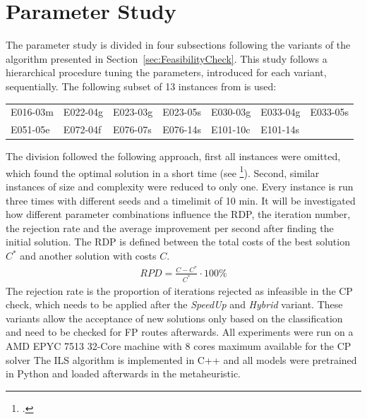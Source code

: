 \section{Parameter Study}
\label{sec:parameter_study}

The parameter study is divided in four subsections following the variants of the algorithm
presented in Section~\ref{sec:FeasibilityCheck}. This study follows a hierarchical procedure
tuning the parameters, introduced for each variant, sequentially. The following subset of 13
instances from \gendreauDataSetText is used:


\begin{table}[ht]
    \centering
    \setlength{\tabcolsep}{0.75em}
    \def\arraystretch{1.5}
    \begin{tabular}{lllllll}
        E016-03m & E022-04g & E023-03g & E023-05s & E030-03g & E033-04g & E033-05s \\
        E051-05e & E072-04f & E076-07s & E076-14s & E101-10c & E101-14s &          \\
    \end{tabular}
\end{table}

The division followed the following approach, first all instances were omitted, which found
the optimal solution in a short time (see \cite{tamke_branch-and-cut_2024}\footcite[cf.][p.26]{tamke_branch-and-cut_2024}).
Second, similar instances of size and complexity were reduced to only one.
Every instance is run three times with different seeds and a timelimit of 10 min. It will be investigated
how different parameter combinations influence the \gls{RDP}, the iteration number, the rejection rate and
the average improvement per second after finding the initial solution. The \gls{RDP} is defined between the
total costs of the best solution $C^*$ and another solution with costs $C$.
\begin{align}
    RPD = \frac{C - C^*}{C^*} \cdot 100\%
\end{align}
The rejection rate is the proportion of iterations rejected as infeasible in the \gls{CP} check, which needs
to be applied after the \textit{SpeedUp} and \textit{Hybrid} variant. These variants allow the acceptance of
new solutions only based on the classification and need to be checked for \gls{FP} routes afterwards.
All experiments were run on a AMD EPYC 7513 32-Core machine with 8 cores maximum available for the \gls{CP} solver
The \gls{ILS} algorithm is implemented in C++ and all models were pretrained in Python and loaded afterwards in
the metaheuristic.

